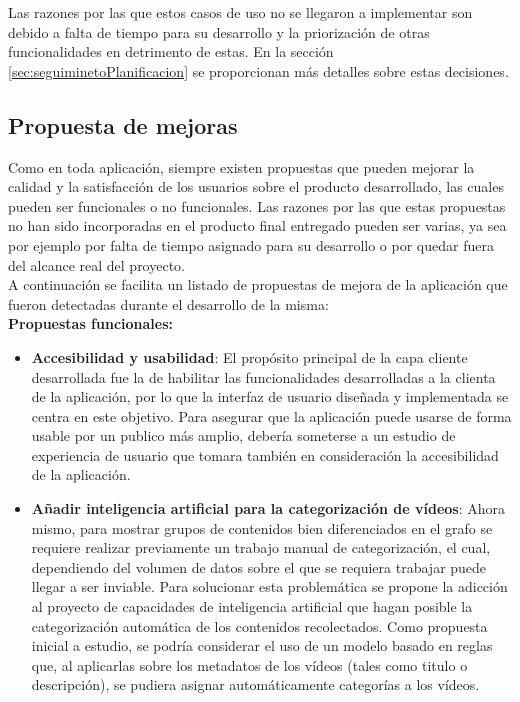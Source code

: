 \documentclass[11pt,a4paper]{article}
\begin{document}
Las razones por las que estos casos de uso no se llegaron a implementar son debido a falta de tiempo para su desarrollo y la priorización de otras funcionalidades en detrimento de estas. En la sección \ref{sec:seguiminetoPlanificacion} se proporcionan más detalles sobre estas decisiones.

\medskip 

\subsection{Propuesta de mejoras}
Como en toda aplicación, siempre existen propuestas que pueden mejorar la calidad y la satisfacción de los usuarios sobre el producto desarrollado, las cuales pueden ser funcionales o no funcionales. Las razones por las que estas propuestas no han sido incorporadas en el producto final entregado pueden ser varias, ya sea por ejemplo por falta de tiempo asignado para su desarrollo o por quedar fuera del alcance real del proyecto.
\\

A continuación se facilita un listado de propuestas de mejora de la aplicación que fueron detectadas durante el desarrollo de la misma:
\\

\noindent\textbf{Propuestas funcionales:}
\begin{itemize}
\item \textbf{Accesibilidad y usabilidad}: El propósito principal de la capa cliente desarrollada fue la de habilitar las funcionalidades desarrolladas a la clienta de la aplicación, por lo que la interfaz de usuario diseñada y implementada se centra en este objetivo. Para asegurar que la aplicación puede usarse de forma usable por un publico más amplio, debería someterse a un estudio de experiencia de usuario que tomara también en consideración la accesibilidad de la aplicación.
\item \textbf{Añadir inteligencia artificial para la categorización de vídeos}: Ahora mismo, para mostrar grupos de contenidos bien diferenciados en el grafo se requiere realizar previamente un trabajo manual de categorización, el cual, dependiendo del volumen de datos sobre el que se requiera trabajar puede llegar a ser inviable. Para solucionar esta problemática se propone la adicción al proyecto de capacidades de inteligencia artificial que hagan posible la categorización automática de los contenidos recolectados. Como propuesta inicial a estudio, se podría considerar el uso de un modelo basado en reglas que, al aplicarlas sobre los metadatos de los vídeos (tales como titulo o descripción), se pudiera asignar automáticamente categorías a los vídeos.
\end{itemize}
\medskip 
\end{document}
